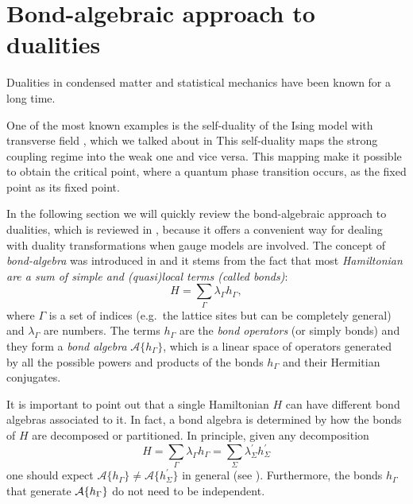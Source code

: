 \section{Bond-algebraic approach to dualities}
\label{sec:bond_algebraic_approach_to_dualities}

Dualities in condensed matter and statistical mechanics have been known for a long time.

One of the most known examples is the self-duality of the Ising model with transverse field \cite{kramers1941statistics,fradkin1978order}, which we talked about in
This self-duality maps the strong coupling regime into the weak one and vice versa.
This mapping make it possible to obtain the critical point, where a quantum phase transition occurs, as the fixed point as its fixed point.


In the following section we will quickly review the bond-algebraic approach to dualities, which is reviewed in \cite{cobanera2011bond}, because it offers a convenient way for dealing with duality transformations when gauge models are involved.
The concept of \emph{bond-algebra} was introduced in \cite{nussinov2009bond} and it stems from the fact that most \emph{Hamiltonian are a sum of simple and (quasi)local terms (called bonds)}:
\begin{equation}
    H = \sum_{\Gamma} \lambda_{\Gamma} h_{\Gamma},
\end{equation}
where $\Gamma$ is a set of indices (e.g.~the lattice sites but can be completely general) and $\lambda_{\Gamma}$ are numbers.
The terms $h_{\Gamma}$ are the \emph{bond operators} (or simply bonds) and they form a \emph{bond algebra} $\mathcal{A}\{h_{\Gamma}\}$, which is a linear space of operators generated by all the possible powers and products of the bonds $h_{\Gamma}$ and their Hermitian conjugates.

It is important to point out that a single Hamiltonian $H$ can have different bond algebras associated to it.
In fact, a bond algebra is determined by how the bonds of $H$ are decomposed or partitioned.
In principle, given any decomposition
\begin{equation*}
    H
    = \sum_{\Gamma} \lambda_{\Gamma} h_{\Gamma}
    = \sum_{\Sigma} \lambda^\prime_{\Sigma} h^\prime_{\Sigma}
\end{equation*}
one should expect $\mathcal{A}\{h_{\Gamma}\} \neq \mathcal{A}\{ h^{\prime}_{\Sigma} \}$ in general (see \cite{cobanera2011bond}).
Furthermore, the bonds $h_{\Gamma}$ that generate $\mathcal{A}\Bqty{ h_{\Gamma} }$ do not need to be independent.

